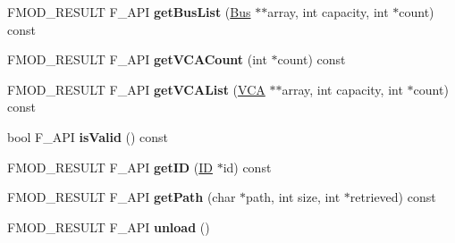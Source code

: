 \begin{DoxyCompactItemize}
\item 
\hypertarget{class_f_m_o_d_1_1_studio_1_1_bank_adb5f1e2bb62341f2c8118354ad8e4c2e}{F\+M\+O\+D\+\_\+\+R\+E\+S\+U\+L\+T F\+\_\+\+A\+P\+I {\bfseries get\+Bus\+List} (\hyperlink{class_f_m_o_d_1_1_studio_1_1_bus}{Bus} $\ast$$\ast$array, int capacity, int $\ast$count) const }\label{class_f_m_o_d_1_1_studio_1_1_bank_adb5f1e2bb62341f2c8118354ad8e4c2e}

\item 
\hypertarget{class_f_m_o_d_1_1_studio_1_1_bank_a4716bc370778f4cdb48ec93cf1f2e5c3}{F\+M\+O\+D\+\_\+\+R\+E\+S\+U\+L\+T F\+\_\+\+A\+P\+I {\bfseries get\+V\+C\+A\+Count} (int $\ast$count) const }\label{class_f_m_o_d_1_1_studio_1_1_bank_a4716bc370778f4cdb48ec93cf1f2e5c3}

\item 
\hypertarget{class_f_m_o_d_1_1_studio_1_1_bank_a2940d5501180f631e33ae37b979bc1c3}{F\+M\+O\+D\+\_\+\+R\+E\+S\+U\+L\+T F\+\_\+\+A\+P\+I {\bfseries get\+V\+C\+A\+List} (\hyperlink{class_f_m_o_d_1_1_studio_1_1_v_c_a}{V\+C\+A} $\ast$$\ast$array, int capacity, int $\ast$count) const }\label{class_f_m_o_d_1_1_studio_1_1_bank_a2940d5501180f631e33ae37b979bc1c3}

\item 
\hypertarget{class_f_m_o_d_1_1_studio_1_1_bank_aac9ae83584c41cd95ac8a3103f44f599}{bool F\+\_\+\+A\+P\+I {\bfseries is\+Valid} () const }\label{class_f_m_o_d_1_1_studio_1_1_bank_aac9ae83584c41cd95ac8a3103f44f599}

\item 
\hypertarget{class_f_m_o_d_1_1_studio_1_1_bank_ad221b46a8b195920b0736eb0e88d90e6}{F\+M\+O\+D\+\_\+\+R\+E\+S\+U\+L\+T F\+\_\+\+A\+P\+I {\bfseries get\+I\+D} (\hyperlink{struct_f_m_o_d___g_u_i_d}{I\+D} $\ast$id) const }\label{class_f_m_o_d_1_1_studio_1_1_bank_ad221b46a8b195920b0736eb0e88d90e6}

\item 
\hypertarget{class_f_m_o_d_1_1_studio_1_1_bank_a48bcbdad67350d113519d0adc0898275}{F\+M\+O\+D\+\_\+\+R\+E\+S\+U\+L\+T F\+\_\+\+A\+P\+I {\bfseries get\+Path} (char $\ast$path, int size, int $\ast$retrieved) const }\label{class_f_m_o_d_1_1_studio_1_1_bank_a48bcbdad67350d113519d0adc0898275}

\item 
\hypertarget{class_f_m_o_d_1_1_studio_1_1_bank_a994ccae786aad7e7cf5d470882d5bb62}{F\+M\+O\+D\+\_\+\+R\+E\+S\+U\+L\+T F\+\_\+\+A\+P\+I {\bfseries unload} ()}\label{class_f_m_o_d_1_1_studio_1_1_bank_a994ccae786aad7e7cf5d470882d5bb62}


\end{DoxyCompactItemize}
